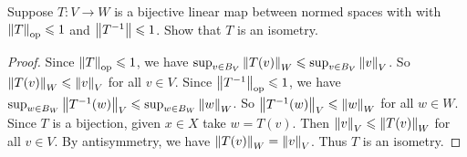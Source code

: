 \documentclass[11pt,twoside,openany]{memoir}
\begin{document}
\addtocounter{exercise}{1}
    \begin{exercise}
        Suppose $T:V \rightarrow W$ is a bijective linear map between normed spaces with with $\left\lVert T \right\rVert_{\operatorname{op}} \leqslant 1$ and $\left\lVert T^{-1} \right\rVert \leqslant 1$. Show that $T$ is an isometry.
    \end{exercise}
        \begin{proof}
            Since $\left\lVert T \right\rVert_\text{op} \leqslant 1$, we have $\sup_{v \in B_V} \left\lVert T(v) \right\rVert_W \leqslant \sup_{v \in B_V}\left\lVert v \right\rVert_V$. So $\left\lVert T(v) \right\rVert_W \leqslant \left\lVert v \right\rVert_V$ for all $v \in V$. Since $\left\lVert T^{-1} \right\rVert_\text{op} \leqslant 1$, we have $\sup_{w \in B_W} \left\lVert T^{-1}(w) \right\rVert_V \leqslant \sup_{w \in B_W}\left\lVert w \right\rVert_W$. So $\left\lVert T^{-1}(w) \right\rVert_V \leqslant \left\lVert w \right\rVert_W$ for all $w \in W$. Since $T$ is a bijection, given $x \in X$ take $w = T(v)$. Then $\left\lVert v \right\rVert_V \leqslant \left\lVert T(v) \right\rVert_W$ for all $v \in V$. By antisymmetry, we have $\left\lVert T(v) \right\rVert_W = \left\lVert v \right\rVert_V$. Thus $T$ is an isometry.
        \end{proof}
\end{document}
